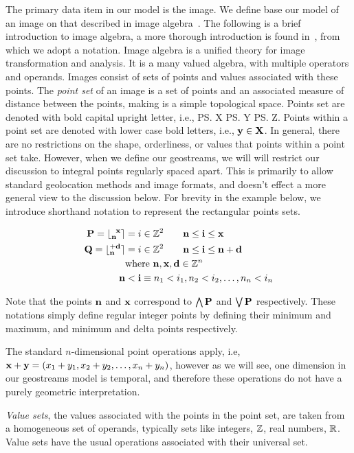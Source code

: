 \documentclass{vldb}
\begin{document}
The primary data item in our model is the image.  We define base our
model of an image on that described in image
algebra~\cite{wilson01handb-comput, ritter99image-algeb}.  The
following is a brief introduction to image algebra, a more thorough
introduction is found in~\cite{wilson01handb-comput}, from which we
adopt a notation.  Image algebra is a unified theory for image
transformation and analysis.  It is a many valued algebra, with
multiple operators and operands.  Images consist of sets of points and
values associated with these points.  The \emph{point set} of an image
is a set of points and an associated measure of distance between the
points, making is a simple topological space.  Points set are denoted
with bold capital upright letter, i.e., \ps{X} \ps{Y} \ps{Z}.  Points
within a point set are denoted with lower case bold letters, i.e.,
$\pt{y} \in \ps{X}$.  In general, there are no restrictions on the
shape, orderliness, or values that points within a point set take.
However, when we define our geostreams, we will will restrict our
discussion to integral points regularly spaced apart.  This is
primarily to allow standard geolocation methods and image formats, and
doesn't effect a more general view to the discussion below.  For
brevity in the example below, we introduce shorthand notation to
represent the rectangular points sets.

\begin{align*}
\ps{P} = \RPSnx{n}{x} &= {i \in \Z[2] \qquad \pt{n} \le \pt{i} \le \pt{x}}  \\
\ps{Q} = \RPSnd{n}{d} &= {i \in \Z[2] \qquad \pt{n} \le \pt{i} \le \pt{n}+\pt{d}} \\
& \text{where } \pt{n},\pt{x},\pt{d} \in \Z[n] \\
\pt{n} &< \pt{i} \equiv n_1 < i_1, n_2 < i_2, \ldots, n_n < i_n
\end{align*}

Note that the points $\pt{n}$ and $\pt{x}$ correspond to
$\bigwedge{\ps{P}}$ and $\bigvee{\ps{P}}$ respectively.  These
notations simply define regular integer points by defining their
minimum and maximum, and minimum and delta points respectively.

The standard $n$-dimensional point operations apply, i.e,
$\im{x}+\im{y} = (x_1+y_1,x_2+y_2,\ldots,x_n+y_n)$, however as we will
see, one dimension in our geostreams model is temporal, and therefore
these operations do not have a purely geometric interpretation.

\emph{Value sets}, the values associated with the points in the point
set, are taken from a homogeneous set of operands, typically sets like
integers, $\Bbb{Z}$, real numbers, $\Bbb{R}$.  Value sets have the usual
operations associated with their universal set.
\end{document}
